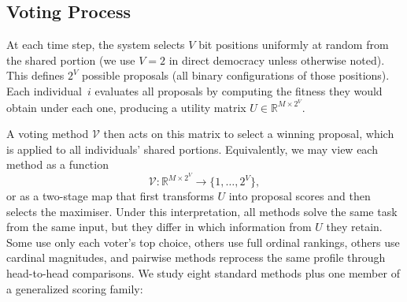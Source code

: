 \subsection{Voting Process}

At each time step, the system selects $V$ bit positions uniformly at random from
the shared portion (we use $V=2$ in direct democracy unless otherwise noted).
This defines $2^V$ possible
proposals (all binary configurations of those positions). Each individual~$i$
evaluates all proposals by computing the fitness they would obtain under each
one, producing a utility matrix $U \in \mathbb{R}^{M \times 2^V}$.

A voting method $\mathcal{V}$ then acts on this matrix to select a winning
proposal, which is applied to all individuals' shared portions. Equivalently, we
may view each method as a function
\begin{equation}
  \mathcal{V}: \mathbb{R}^{M \times 2^V} \to \{1,\ldots,2^V\},
\end{equation}
or as a two-stage map that first transforms $U$ into proposal scores and then
selects the maximiser. Under this interpretation, all methods solve the same
task from the same input, but they differ in which information from $U$ they
retain. Some use only each voter's top choice, others use full ordinal
rankings, others use cardinal magnitudes, and pairwise methods reprocess the
same profile through head-to-head comparisons. We study eight standard methods
plus one member of a generalized scoring family:

